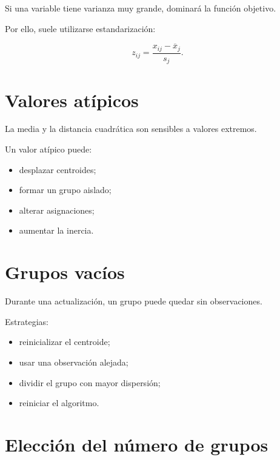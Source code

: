 \documentclass[
  spanish,
  10.5pt,
  letterpaper,
  DIV=11,
  numbers=noendperiod,
  oneside,
  open=any]{scrreprt}
\providecommand{\tightlist}{%
  \setlength{\itemsep}{0pt}\setlength{\parskip}{0pt}}
\theoremstyle{definition}
\theoremstyle{definition}
\theoremstyle{plain}
\theoremstyle{remark}
\begin{document}
Si una variable tiene varianza muy grande, dominará la función objetivo.

Por ello, suele utilizarse estandarización:

\[
z_{ij}
=
\frac{x_{ij}-\overline{x}_j}{s_j}.
\]

\section*{Valores atípicos}\label{valores-atuxedpicos}


La media y la distancia cuadrática son sensibles a valores extremos.

Un valor atípico puede:

\begin{itemize}
\tightlist
\item
  desplazar centroides;
\item
  formar un grupo aislado;
\item
  alterar asignaciones;
\item
  aumentar la inercia.
\end{itemize}

\section*{Grupos vacíos}\label{grupos-vacuxedos}


Durante una actualización, un grupo puede quedar sin observaciones.

Estrategias:

\begin{itemize}
\tightlist
\item
  reinicializar el centroide;
\item
  usar una observación alejada;
\item
  dividir el grupo con mayor dispersión;
\item
  reiniciar el algoritmo.
\end{itemize}

\section*{Elección del número de
grupos}\label{elecciuxf3n-del-nuxfamero-de-grupos}
\end{document}
